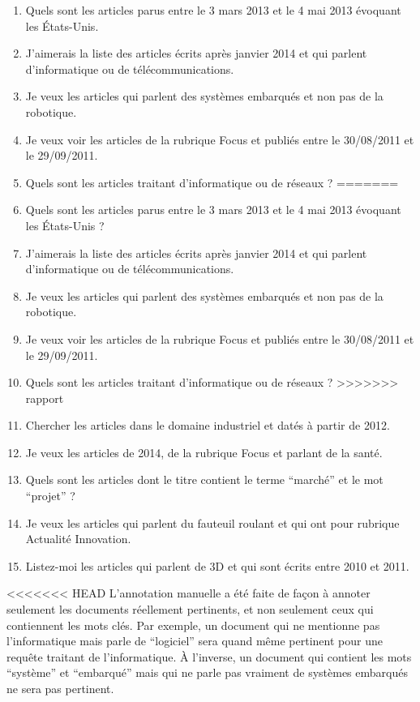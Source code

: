 \begin{enumerate}
<<<<<<< HEAD
    \item[0.] Quels sont les articles parus entre le 3 mars 2013 et le 4 mai 2013 évoquant les États-Unis.
    \item[1.] J'aimerais la liste des articles écrits après janvier 2014 et qui parlent d'informatique ou de télécommunications.
    \item[2.] Je veux les articles qui parlent des systèmes embarqués et non pas de la robotique.
    \item[3.] Je veux voir les articles de la rubrique Focus et publiés entre le 30/08/2011 et le 29/09/2011.
    \item[4.] Quels sont les articles traitant d'informatique ou de réseaux ?
=======
    \item[0.] Quels sont les articles parus entre le 3 mars 2013 et le 4 mai 2013 évoquant les États-Unis ?
    \item[1.] J’aimerais la liste des articles écrits après janvier 2014 et qui parlent d’informatique ou de télécommunications.
    \item[2.] Je veux les articles qui parlent des systèmes embarqués et non pas de la robotique.
    \item[3.] Je veux voir les articles de la rubrique Focus et publiés entre le 30/08/2011 et le 29/09/2011.
    \item[4.] Quels sont les articles traitant d’informatique ou de réseaux ?
>>>>>>> rapport
    \item[5.] Chercher les articles dans le domaine industriel et datés à partir de 2012.
    \item[6.] Je veux les articles de 2014, de la rubrique Focus et parlant de la santé.
    \item[7.] Quels sont les articles dont le titre contient le terme ``marché'' et le mot ``projet'' ?
    \item[8.] Je veux les articles qui parlent du fauteuil roulant et qui ont pour rubrique Actualité Innovation.
    \item[9.] Listez-moi les articles qui parlent de 3D et qui sont écrits entre 2010 et 2011.
\end{enumerate}
  

<<<<<<< HEAD
L'annotation manuelle a été faite de façon à annoter seulement les documents réellement pertinents, et non seulement ceux qui contiennent les mots clés. Par exemple, un document qui ne mentionne pas l'informatique mais parle de ``logiciel'' sera quand même pertinent pour une requête traitant de l'informatique. À l'inverse, un document qui contient les mots ``système'' et ``embarqué'' mais qui ne parle pas vraiment de systèmes embarqués ne sera pas pertinent.

